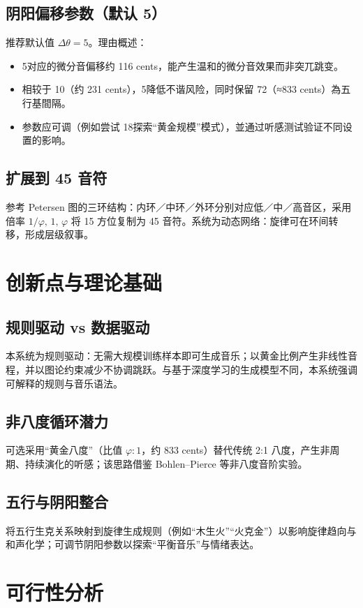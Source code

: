 \documentclass{article}
\begin{document}
\subsection{阴阳偏移参数（默认 5\textdegree）}
推荐默认值 $\Delta\theta=5$\textdegree。理由概述：
\begin{itemize}
  \item 5\textdegree 对应的微分音偏移约 116 cents，能产生温和的微分音效果而非突兀跳变。
  \item 相较于 10\textdegree（约 231 cents），5\textdegree 降低不谐风险，同时保留 72\textdegree（≈833 cents）為五行基間隔。
  \item 参数应可调（例如尝试 18\textdegree 探索“黄金规模”模式），並通过听感测试验证不同设置的影响。
\end{itemize}

\subsection{扩展到 45 音符}
参考 Petersen 图的三环结构：内环／中环／外环分别对应低／中／高音区，采用倍率 $1/\varphi,\,1,\,\varphi$ 将 15 方位复制为 45 音符。系统为动态网络：旋律可在环间转移，形成层级叙事。

\section{创新点与理论基础}
\subsection{规则驱动 vs 数据驱动}
本系统为规则驱动：无需大规模训练样本即可生成音乐；以黄金比例产生非线性音程，并以图论约束减少不协调跳跃。与基于深度学习的生成模型不同，本系统强调可解释的规则与音乐语法。

\subsection{非八度循环潜力}
可选采用“黄金八度”（比值 $\varphi:1$，约 833 cents）替代传统 2:1 八度，产生非周期、持续演化的听感；该思路借鉴 Bohlen--Pierce 等非八度音阶实验。

\subsection{五行与阴阳整合}
将五行生克关系映射到旋律生成规则（例如“木生火”“火克金”）以影响旋律趋向与和声化学；可调节阴阳参数以探索“平衡音乐”与情绪表达。

\section{可行性分析}
\end{document}
